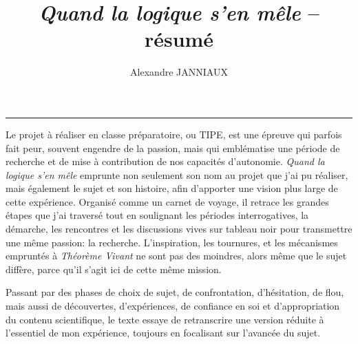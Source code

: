 \documentclass{article}
\title{\emph{Quand la logique s'en mêle} -- résumé}
\author{Alexandre JANNIAUX}
\date{}
\begin{document}
\maketitle
\vspace{0.5cm}\hrule\vspace{0.5cm}

Le projet à réaliser en classe préparatoire, ou TIPE, est une épreuve qui parfois fait peur, souvent engendre de la passion, mais qui emblématise une période de recherche et de mise à contribution de nos capacités d'autonomie.
\emph{Quand la logique s'en mêle} emprunte non seulement son nom au projet que j'ai pu réaliser, mais également le sujet et son histoire, afin d'apporter une vision plus large de cette expérience.
Organisé comme un carnet de voyage, il retrace les grandes étapes que j'ai traversé tout en soulignant les périodes interrogatives, la démarche, les rencontres et les discussions vives sur tableau noir pour transmettre une même passion: la recherche. 
L'inspiration, les tournures, et les mécanismes empruntés à \emph{Théorème Vivant} ne sont pas des moindres, alors même que le sujet diffère, parce qu'il s'agit ici de cette même mission.

Passant par des phases de choix de sujet, de confrontation, d'hésitation, de flou, mais aussi de découvertes, d'expériences, de confiance en soi et d'appropriation du contenu scientifique, le texte essaye de retranscrire une version réduite à l'essentiel de mon expérience, toujours en focalisant sur l'avancée du sujet.
\end{document}

